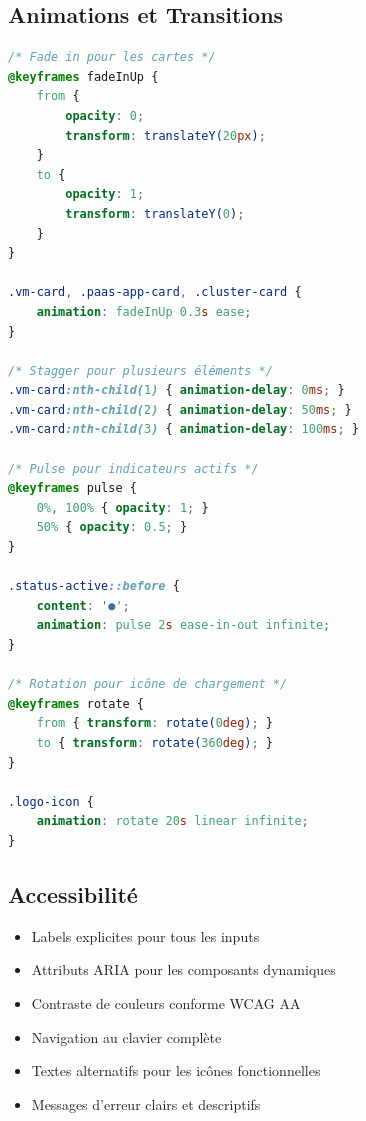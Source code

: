 \documentclass[12pt,a4paper]{article}
\begin{document}
\subsection{Animations et Transitions}

\begin{lstlisting}[language=CSS,caption=Animations (main.css)]
/* Fade in pour les cartes */
@keyframes fadeInUp {
    from {
        opacity: 0;
        transform: translateY(20px);
    }
    to {
        opacity: 1;
        transform: translateY(0);
    }
}

.vm-card, .paas-app-card, .cluster-card {
    animation: fadeInUp 0.3s ease;
}

/* Stagger pour plusieurs éléments */
.vm-card:nth-child(1) { animation-delay: 0ms; }
.vm-card:nth-child(2) { animation-delay: 50ms; }
.vm-card:nth-child(3) { animation-delay: 100ms; }

/* Pulse pour indicateurs actifs */
@keyframes pulse {
    0%, 100% { opacity: 1; }
    50% { opacity: 0.5; }
}

.status-active::before {
    content: '●';
    animation: pulse 2s ease-in-out infinite;
}

/* Rotation pour icône de chargement */
@keyframes rotate {
    from { transform: rotate(0deg); }
    to { transform: rotate(360deg); }
}

.logo-icon {
    animation: rotate 20s linear infinite;
}
\end{lstlisting}

\subsection{Accessibilité}

\begin{infobox}
\begin{itemize}
    \item Labels explicites pour tous les inputs
    \item Attributs ARIA pour les composants dynamiques
    \item Contraste de couleurs conforme WCAG AA
    \item Navigation au clavier complète
    \item Textes alternatifs pour les icônes fonctionnelles
    \item Messages d'erreur clairs et descriptifs
\end{itemize}
\end{infobox}
\end{document}

